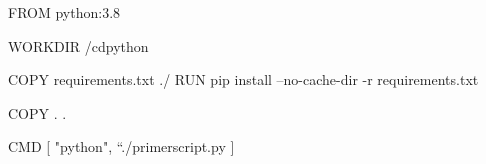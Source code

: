 FROM python:3.8

WORKDIR /cdpython

COPY requirements.txt ./
RUN pip install --no-cache-dir -r requirements.txt

COPY . .

CMD [ "python", “./primerscript.py ]